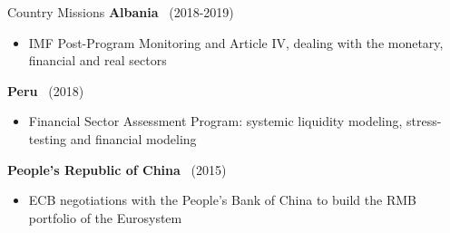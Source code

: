 \documentclass[usegeometry, 10pt, a4paper]{cv} %
\newcommand{\activite}[1]{\textbf{#1}\ }
\newcommand{\midreduce}{-0.5cm}
\begin{document}
\begin{rubriquetableau}[0.95\textwidth]{Country Missions}
  \activite{Albania} (2018-2019)\\
  \vspace{\midreduce}
  \begin{itemize}[label={}]
    \item \small{IMF Post-Program Monitoring and Article IV, dealing with the monetary, financial and real
      sectors}
  \end{itemize}

  \activite{Peru} (2018)\\
  \vspace{\midreduce}
  \begin{itemize}[label={}]
    \item \small{Financial Sector Assessment Program: systemic liquidity modeling, stress-testing and financial modeling}
  \end{itemize}

  \activite{People's Republic of China} (2015)\\
  \vspace{\midreduce}
  \begin{itemize}[label={}]
    \item \small{ECB negotiations with the People's Bank of China to build the
        RMB portfolio of the Eurosystem}
  \end{itemize}

\normalsize
\end{rubriquetableau}


\end{document}
